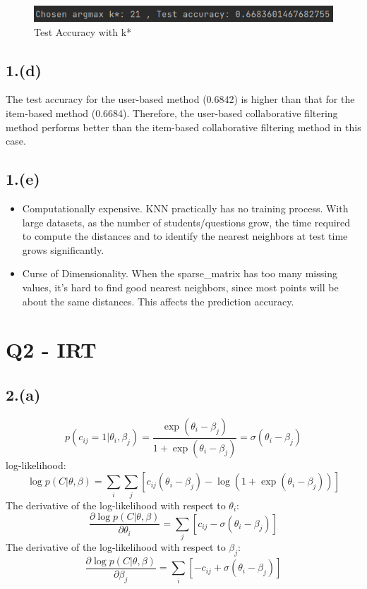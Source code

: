 \documentclass{article}
\begin{document}
\begin{figure}[H]
    \centering
    \includegraphics[width=\textwidth]{knn_impute_by_item_test.png}
    \caption{Test Accuracy with k*}
\end{figure}
\newpage

\subsection*{1.(d)}
The test accuracy for the user-based method (0.6842) is higher than that for the item-based method (0.6684). Therefore, the user-based collaborative filtering method performs better than the item-based collaborative filtering method in this case.

\subsection*{1.(e)}
\begin{itemize}
    \item Computationally expensive. KNN practically has no training process. With large datasets, as the number of students/questions grow, the time required to compute the distances and to identify the nearest neighbors at test time grows significantly.
    \item Curse of Dimensionality. When the sparse\_matrix has too many missing values, it’s hard to find good nearest neighbors, since most points will be about the same distances. This affects the prediction accuracy.
\end{itemize}
\newpage


\section*{Q2 - IRT}

\subsection*{2.(a)}

\[
p(c_{ij} = 1 | \theta_i, \beta_j) = \frac{\exp(\theta_i - \beta_j)}{1 + \exp(\theta_i - \beta_j)} = \sigma(\theta_i - \beta_j)
\]
log-likelihood:
\[
\log p(C | \theta, \beta) = \sum_{i}\sum_{j} \left[ c_{ij} (\theta_i - \beta_j) - \log (1 + \exp(\theta_i - \beta_j)) \right]
\]
The derivative of the log-likelihood with respect to $\theta_i$:
\[
\frac{\partial \log p(C | \theta, \beta)}{\partial \theta_i} = \sum_{j} \left[ c_{ij} - \sigma(\theta_i - \beta_j) \right]
\]
The derivative of the log-likelihood with respect to $\beta_j$:
\[
\frac{\partial \log p(C | \theta, \beta)}{\partial \beta_j} = \sum_{i} \left[ - c_{ij} + \sigma(\theta_i - \beta_j) \right]
\]
\end{document}
